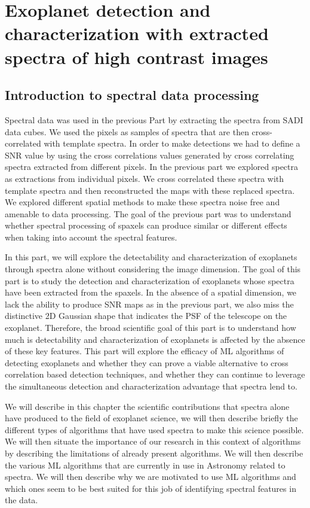 \part{Exoplanet detection and characterization with extracted spectra of high contrast images}

\vfill
\startcontents[chapters]
\printmyminitoc{}
\chapter{Introduction to spectral data processing}\label{chap: II.1}
Spectral data was used in the previous Part by extracting the spectra from SADI data cubes.
We used the pixels as samples of spectra that are then cross-correlated with template spectra.
In order to make detections we had to define a SNR value by using the cross correlations values generated by cross correlating spectra extracted from different pixels.
In the previous part we explored spectra as extractions from individual pixels.
We cross correlated these spectra with template spectra and then reconstructed the maps with these replaced spectra.
We explored different spatial methods to make these spectra noise free and amenable to data processing.
The goal of the previous part was to understand whether spectral processing of spaxels can produce similar or different effects when taking into account the spectral features.

In this part, we will explore the detectability and characterization of exoplanets through spectra alone without considering the image dimension. 
The goal of this part is to study the detection and characterization of exoplanets whose spectra have been extracted from the spaxels.
In the absence of a spatial dimension, we lack the ability to produce SNR maps as in the previous part, we also miss the distinctive 2D Gaussian shape that indicates the PSF of the telescope on the exoplanet.
Therefore, the broad scientific goal of this part is to understand how much is detectability and characterization of exoplanets is affected by the absence of these key features.
This part will explore the efficacy of ML algorithms of detecting exoplanets and whether they can prove a viable alternative to cross correlation based detection techniques, and whether they can continue to leverage the simultaneous detection and characterization advantage that spectra lend to.

We will describe in this chapter the scientific contributions that spectra alone have produced to the field of exoplanet science, we will then describe briefly the different types of algorithms that have used spectra to make this science possible. 
We will then situate the importance of our research in this context of algorithms by describing the limitations of already present algorithms. 
We will then describe the various ML algorithms that are currently in use in Astronomy related to spectra.
We will then describe why we are motivated to use ML algorithms and which ones seem to be best suited for this job of identifying spectral features in the data.
